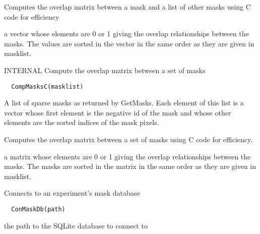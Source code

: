 \documentclass[a4paper]{book}
\begin{document}
%
\begin{Details}\relax
Computes the overlap matrix between a mask and a list of
other masks using C code for efficiency
\end{Details}
%
\begin{Value}
a vector whose elements are 0 or 1 giving the overlap
relationships between the masks.  The values are sorted
in the vector in the same order as they are given in
masklist.
\end{Value}
%
\begin{Description}\relax
INTERNAL Compute the overlap matrix between a set of
masks
\end{Description}
%
\begin{Usage}
\begin{verbatim}
  CompMasksC(masklist)
\end{verbatim}
\end{Usage}
%
\begin{Arguments}
\begin{ldescription}
\item[\code{masklist}] A list of sparse masks as returned by
GetMasks.  Each element of this list is a vector whose
first element is the negative id of the mask and whose
other elements are the sorted indices of the mask
pixels.
\end{ldescription}
\end{Arguments}
%
\begin{Details}\relax
Computes the overlap matrix between a set of masks using
C code for efficiency.
\end{Details}
%
\begin{Value}
a matrix whose elements are 0 or 1 giving the overlap
relationships between the masks.  The masks are sorted in
the matrix in the same order as they are given in
masklist.
\end{Value}
%
\begin{Description}\relax
Connects to an experiment's mask database
\end{Description}
%
\begin{Usage}
\begin{verbatim}
  ConMaskDb(path)
\end{verbatim}
\end{Usage}
%
\begin{Arguments}
\begin{ldescription}
\item[\code{path}] the path to the SQLite database to connect
to
\end{ldescription}
\end{Arguments}
\end{document}
